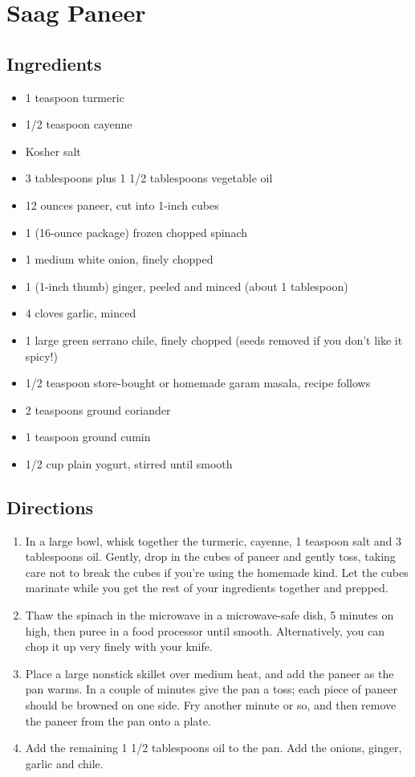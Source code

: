 \documentclass[oneside,11pt]{book}
\newcommand{\Ingredients}[1]{
    \subsection*{Ingredients}
    \begin{itemize} 
        #1 
    \end{itemize}
}
\newcommand{\Directions}[1]{
    \subsection*{Directions}
    \begin{enumerate} 
        #1 
    \end{enumerate}
}
\newcommand{\recipe}[3]{
    \pagebreak
    \section*{ \hspace{-12pt} #1 }
    \addcontentsline{toc}{section}{ \hspace{-6pt} #1 }
    
    \begin{minipage}[t]{0.35\textwidth}
        #2
    \end{minipage}
    \hspace{0.05\textwidth}
    \begin{minipage}[t]{0.6\textwidth}
        #3
    \end{minipage}
}
\begin{document}
    \recipe{Saag Paneer}{
        \Ingredients{
            \item 1 teaspoon turmeric
            \item 1/2 teaspoon cayenne
            \item Kosher salt
            \item 3 tablespoons plus 1 1/2 tablespoons vegetable oil
            \item 12 ounces paneer, cut into 1-inch cubes
            \item 1 (16-ounce package) frozen chopped spinach
            \item 1 medium white onion, finely chopped
            \item 1 (1-inch thumb) ginger, peeled and minced (about 1 tablespoon)
            \item 4 cloves garlic, minced
            \item 1 large green serrano chile, finely chopped (seeds removed if you don't like it spicy!)
            \item 1/2 teaspoon store-bought or homemade garam masala, recipe follows
            \item 2 teaspoons ground coriander
            \item 1 teaspoon ground cumin
            \item 1/2 cup plain yogurt, stirred until smooth
        }
    }{
        \Directions{
            \item In a large bowl, whisk together the turmeric, cayenne, 1 teaspoon salt and 3 tablespoons oil. 
                Gently, drop in the cubes of paneer and gently toss, taking care not to break the cubes if you're using the homemade kind. 
                Let the cubes marinate while you get the rest of your ingredients together and prepped.
            \item Thaw the spinach in the microwave in a microwave-safe dish, 5 minutes on high, then puree in a food processor until smooth. 
                Alternatively, you can chop it up very finely with your knife.
            \item Place a large nonstick skillet over medium heat, and add the paneer as the pan warms. 
                In a couple of minutes give the pan a toss; each piece of paneer should be browned on one side. 
                Fry another minute or so, and then remove the paneer from the pan onto a plate.
            \item Add the remaining 1 1/2 tablespoons oil to the pan. 
                Add the onions, ginger, garlic and chile. 
}}
\end{document}
